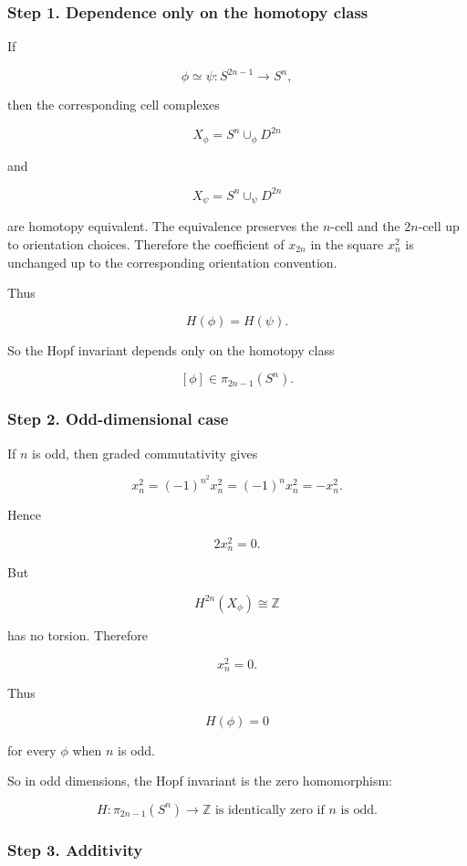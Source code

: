 \documentclass[12pt,a4paper]{article}
\theoremstyle{notespace}
\begin{document}
\subsubsection*{Step 1. Dependence only on the homotopy class}

If

\[
\phi\simeq \psi:S^{2n-1}\to S^n,
\]

then the corresponding cell complexes

\[
X_\phi=S^n\cup_\phi D^{2n}
\]

and

\[
X_\psi=S^n\cup_\psi D^{2n}
\]

are homotopy equivalent. The equivalence preserves the \(n\)-cell and the \(2n\)-cell up to orientation choices. Therefore the coefficient of \(x_{2n}\) in the square \(x_n^2\) is unchanged up to the corresponding orientation convention.

Thus

\[
H(\phi)=H(\psi).
\]

So the Hopf invariant depends only on the homotopy class

\[
[\phi]\in \pi_{2n-1}(S^n).
\]

\subsubsection*{Step 2. Odd-dimensional case}

If \(n\) is odd, then graded commutativity gives

\[
x_n^2
=
(-1)^{n^2}x_n^2
=
(-1)^n x_n^2
=
-x_n^2.
\]

Hence

\[
2x_n^2=0.
\]

But

\[
H^{2n}(X_\phi)\cong \mathbb Z
\]

has no torsion. Therefore

\[
x_n^2=0.
\]

Thus

\[
H(\phi)=0
\]

for every \(\phi\) when \(n\) is odd.

So in odd dimensions, the Hopf invariant is the zero homomorphism:

\[
\boxed{
	H:\pi_{2n-1}(S^n)\to \mathbb Z
	\text{ is identically zero if }n\text{ is odd.}
}
\]

\subsubsection*{Step 3. Additivity}
\end{document}
